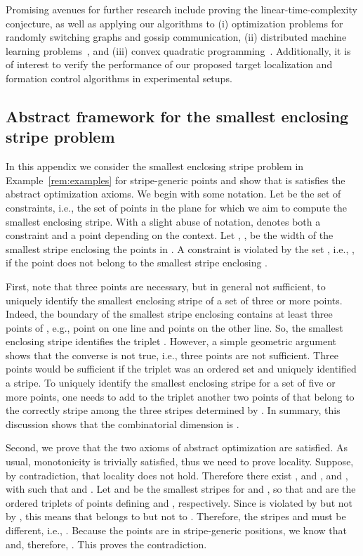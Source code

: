 \documentclass[onecolumn,journal,letterpaper]{IEEEtran}
\begin{document}
Promising avenues for further research include proving the
linear-time-complexity conjecture, as well as applying our algorithms to
(i) optimization problems for randomly switching graphs and gossip
communication, (ii) distributed machine learning
problems~\cite{JB-YD-JT-OW:08,YL-VR-LV:08,KF-BBL-PT:06}, and (iii) convex
quadratic programming~\cite{RG:99}. Additionally, it is of interest to
verify the performance of our proposed target localization and formation
control algorithms in experimental setups.

\appendix

\subsection*{Abstract framework for the smallest enclosing stripe problem}
In this appendix we consider the smallest enclosing stripe problem in
Example~\ref{rem:examples} for stripe-generic points and show that is
satisfies the abstract optimization axioms. We begin with some notation.
Let  be the set of constraints, i.e., the set of points in the plane for
which we aim to compute the smallest enclosing stripe. With a slight abuse
of notation,  denotes both a constraint and a point depending on
the context.  Let , , be the width of the smallest
stripe enclosing the points in . A constraint  is violated by the set
, i.e., , if the point  does not belong
to the smallest stripe enclosing .

First, note that three points are necessary, but in general not sufficient,
to uniquely identify the smallest enclosing stripe of a set  of three or
more points. Indeed, the boundary of the smallest stripe enclosing 
contains at least three points of , e.g., point  on one line and
points  on the other line. So, the smallest enclosing stripe
identifies the triplet . However, a simple geometric
argument shows that the converse is not true, i.e., three points are not
sufficient. Three points would be sufficient if the triplet was an ordered
set and uniquely identified a stripe.
To uniquely identify the smallest enclosing stripe for a set  of five or
more points, one needs to add to the triplet  another two
points of  that belong to the correctly stripe among the three stripes
determined by .  In summary, this discussion shows that
the combinatorial dimension is .


Second, we prove that the two axioms of abstract optimization are
satisfied.  As usual, monotonicity is trivially satisfied, thus we need to
prove locality.
Suppose, by contradiction, that locality does not hold. Therefore there
exist ,  and ,  and , with
 such that  and
.
Let  and  be the smallest stripes for  and , so that
 and
 are the ordered triplets of
points defining  and , respectively.
Since  is violated by  but not by , this means that  belongs to
 but not to . Therefore, the stripes  and  must be
different, i.e., .
Because the points are in stripe-generic positions, we know that
 and, therefore,
. This proves the contradiction.
\end{document}
